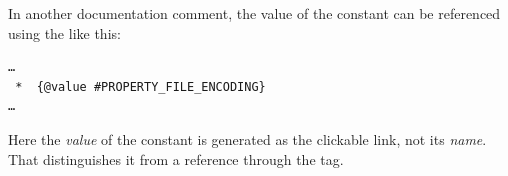 In another documentation comment, the value of the constant can be referenced using the  like this:
\begin{lstlisting}[language=Comment]
…
 *  {@value #PROPERTY_FILE_ENCODING}
…
\end{lstlisting}

Here the \textit{value} of the constant is generated as the clickable link, not its \textit{name}. That distinguishes it from a reference through the  tag.


